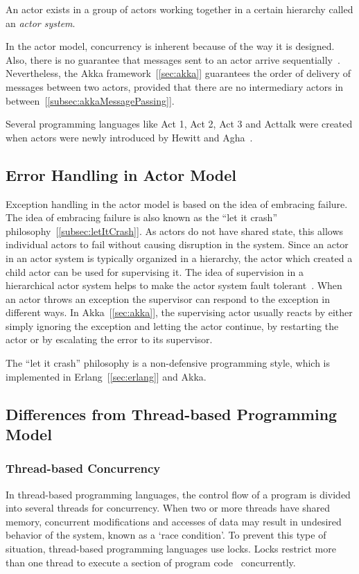   An actor exists in a group of actors working together in a certain hierarchy called an \emph{actor system}.

  In the actor model, concurrency is inherent because of the way it is designed. Also, there is no guarantee that messages sent to an actor arrive sequentially~\cite{hewittVideo}. Nevertheless, the Akka framework~[\autoref{sec:akka}] guarantees the order of delivery of messages between two actors, provided that there are no intermediary actors in between~[\autoref{subsec:akkaMessagePassing}].

  Several programming languages like Act 1, Act 2, Act 3 and Acttalk were created when actors were newly introduced by Hewitt and Agha~\cite{agha, hewitt}.

\subsection{Error Handling in Actor Model}
Exception handling in the actor model is based on the idea of embracing failure. The idea of embracing failure is also known as the “let it crash” philosophy~[\autoref{subsec:letItCrash}]. As actors do not have shared state, this allows individual actors to fail without causing disruption in the system. Since an actor in an actor system is typically organized in a hierarchy, the actor which created a child actor can be used for supervising it. The idea of supervision in a hierarchical actor system helps to make the actor system fault tolerant~\cite{Erb2012}. When an actor throws an exception the supervisor can respond to the exception in different ways. In Akka~[\autoref{sec:akka}], the supervising actor usually reacts by either simply ignoring the exception and letting the actor continue, by restarting the actor or by escalating the error to its supervisor.

  The “let it crash” philosophy is a non-defensive programming style, which is implemented in Erlang~[\autoref{sec:erlang}] and Akka.

\subsection{Differences from Thread-based Programming Model}
\subsubsection{Thread-based Concurrency}
  \label{subsec:thread}
  In thread-based programming languages, the control flow of a program is divided into several threads for concurrency. When two or more threads have shared memory, concurrent modifications and accesses of data may result in undesired behavior of the system, known as a ‘race condition’. To prevent this type of situation, thread-based programming languages use locks. Locks restrict more than one thread to execute a section of program code~\cite{ambientTalk} concurrently.

